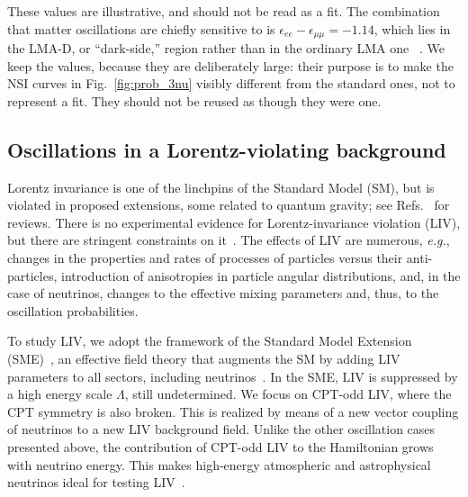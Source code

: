 \documentclass[final,5p,times,twocolumn]{elsarticle}
\newcommand{\eg}{{\it e.g.}}
\newcommand{\fig}{Fig.}
\newcommand{\Refs}{Refs.}
\newcommand{\figu}[1]{\fig~\ref{fig:#1}}
\providecommand{\DIFaddtex}[1]{{\protect\color{blue} \sf #1}} %
\providecommand{\DIFaddbegin}{} %
\providecommand{\DIFaddend}{} %
\providecommand{\DIFadd}[1]{\DIFaddtex{#1}} %
\begin{document}
\DIFaddbegin \DIFadd{These values are illustrative, and should not be read as a fit.  The combination that matter oscillations are chiefly sensitive to is $\epsilon_{ee} - \epsilon_{\mu\mu} = -1.14$, which lies in the LMA-D, or ``dark-side,'' region rather than in the ordinary LMA one\ }\cite{Esteban:2018ppq}\DIFadd{.  We keep the values, because they are deliberately large: their purpose is to make the NSI curves in \figu{prob_3nu} visibly different from the standard ones, not to represent a fit.  They should not be reused as though they were one.
}


\DIFaddend \subsection{Oscillations in a Lorentz-violating background}

Lorentz invariance is one of the linchpins of the Standard Model (SM), but is violated in proposed extensions, some related to quantum gravity; see \Refs\ \cite{Mavromatos:2004sz, Liberati:2009pf, Liberati:2013xla, Tasson:2014dfa} for reviews.  There is no experimental evidence for Lorentz-invariance violation (LIV), but there are stringent constraints on it\ \cite{Kostelecky:2008ts, Abbasi:2010kx, Abe:2014wla, Aartsen:2017ibm}.  The effects of LIV are numerous, \eg, changes in the properties and rates of processes of particles versus their anti-particles, introduction of anisotropies in particle angular distributions, and, in the case of neutrinos, changes to the effective mixing parameters and, thus, to the oscillation probabilities.

To study LIV, we adopt the framework of the Standard Model Extension (SME)\ \cite{Colladay:1998fq}, an effective field theory that augments the SM by adding LIV parameters to all sectors, including neutrinos\ \cite{Coleman:1998ti, Kostelecky:2003xn, Kostelecky:2003cr,  GonzalezGarcia:2004wg, Hooper:2005jp, Kostelecky:2011gq, Diaz:2014yva}.  In the SME, LIV is suppressed by a high energy scale $\Lambda$, still undetermined.  We focus on CPT-odd LIV, where the CPT symmetry is also broken.  This is realized by means of a new vector coupling of neutrinos to a new LIV background field.  Unlike the other oscillation cases presented above, the contribution of CPT-odd LIV to the Hamiltonian grows with neutrino energy.  This makes high-energy atmospheric and astrophysical neutrinos ideal for testing LIV\ \cite{Coleman:1998ti, GonzalezGarcia:2004wg, GonzalezGarcia:2005xw, Anchordoqui:2005gj, Arguelles:2015dca, Bustamante:2015waa, Rasmussen:2017ert, Aartsen:2017ibm, Ahlers:2018mkf, Ackermann:2019cxh}.
\end{document}
